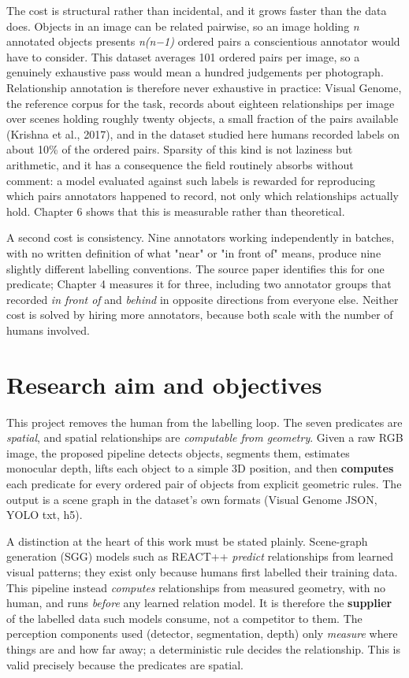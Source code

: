The cost is structural rather than incidental, and it grows faster than the data does. Objects in an image can be related pairwise, so an image holding \textit{n} annotated objects presents \textit{n(n−1)} ordered pairs a conscientious annotator would have to consider. This dataset averages 101 ordered pairs per image, so a genuinely exhaustive pass would mean a hundred judgements per photograph. Relationship annotation is therefore never exhaustive in practice: Visual Genome, the reference corpus for the task, records about eighteen relationships per image over scenes holding roughly twenty objects, a small fraction of the pairs available (Krishna et al., 2017), and in the dataset studied here humans recorded labels on about 10\% of the ordered pairs. Sparsity of this kind is not laziness but arithmetic, and it has a consequence the field routinely absorbs without comment: a model evaluated against such labels is rewarded for reproducing which pairs annotators happened to record, not only which relationships actually hold. Chapter 6 shows that this is measurable rather than theoretical.

A second cost is consistency. Nine annotators working independently in batches, with no written definition of what "near" or "in front of" means, produce nine slightly different labelling conventions. The source paper identifies this for one predicate; Chapter 4 measures it for three, including two annotator groups that recorded \textit{in front of} and \textit{behind} in opposite directions from everyone else. Neither cost is solved by hiring more annotators, because both scale with the number of humans involved.

\section{Research aim and objectives}

This project removes the human from the labelling loop. The seven predicates are \textit{spatial}, and spatial relationships are \textit{computable from geometry}. Given a raw RGB image, the proposed pipeline detects objects, segments them, estimates monocular depth, lifts each object to a simple 3D position, and then \textbf{computes} each predicate for every ordered pair of objects from explicit geometric rules. The output is a scene graph in the dataset's own formats (Visual Genome JSON, YOLO txt, h5).

A distinction at the heart of this work must be stated plainly. Scene-graph generation (SGG) models such as REACT++ \textit{predict} relationships from learned visual patterns; they exist only because humans first labelled their training data. This pipeline instead \textit{computes} relationships from measured geometry, with no human, and runs \textit{before} any learned relation model. It is therefore the \textbf{supplier} of the labelled data such models consume, not a competitor to them. The perception components used (detector, segmentation, depth) only \textit{measure} where things are and how far away; a deterministic rule decides the relationship. This is valid precisely because the predicates are spatial.

